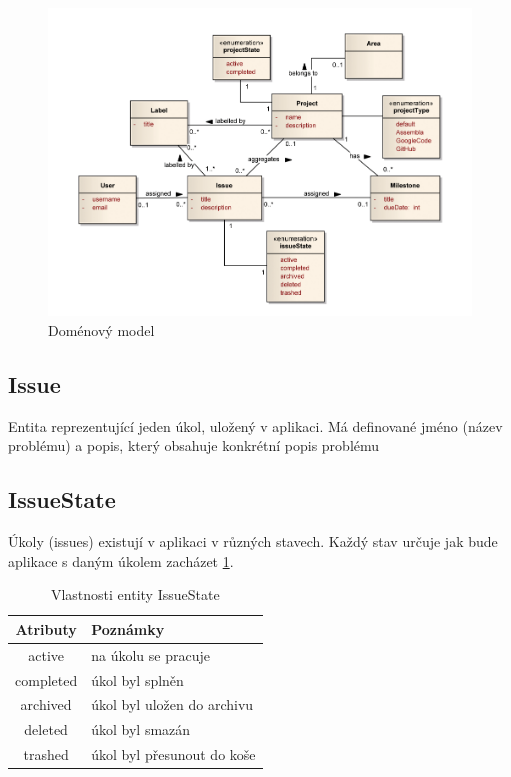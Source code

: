 \begin{figure}[h]
	\includegraphics[keepaspectratio,width=16cm]{figures/domain-model}
	\caption{Doménový model}
	\label{fig:domain-model}
\end{figure}

\subsection{Issue}
Entita reprezentující jeden úkol, uložený v aplikaci. Má definované jméno (název problému) a popis, který obsahuje konkrétní popis problému

\subsection{IssueState}
Úkoly (issues) existují v aplikaci v různých stavech. Každý stav určuje jak bude aplikace s daným úkolem zacházet \ref{tab:issueState}.

\begin{table}[h]
\begin{center}
	\begin{tabular}{|c|l|}
	\hline
	Atributy & Poznámky \\
	\hline
	active & na úkolu se pracuje \\
	completed & úkol byl splněn \\
	archived & úkol byl uložen do archivu \\
	deleted & úkol byl smazán \\
	trashed & úkol byl přesunout do koše \\
	\hline
	\end{tabular}
\end{center}
\caption{Vlastnosti entity IssueState}
\label{tab:issueState}
\end{table}


